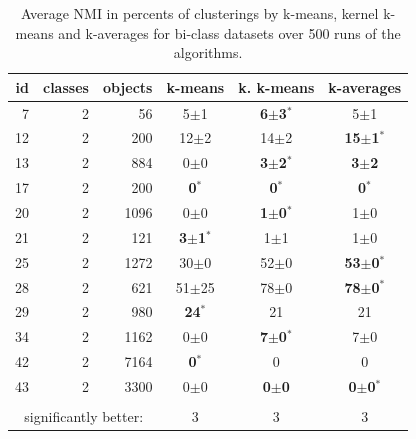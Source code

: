 \documentclass[10pt,journal,compsoc]{IEEEtran}
\begin{document}
\begin{table} 
\begin{center} 
\caption{Average NMI in percents of clusterings by k-means, kernel k-means and k-averages for bi-class datasets over 500 runs of the algorithms.}
\label{tab:results-2} 
\begin{tabular}{rrrccc} 
id & classes & objects & k-means & k. k-means & k-averages \\ 
\hline 
 7 & 2 &   56 & 5$\pm$1 & \textbf{6$\pm$3$^*$} & 5$\pm$1 \\ 
12 & 2 &  200 & 12$\pm$2 & 14$\pm$2 & \textbf{15$\pm$1$^*$} \\ 
13 & 2 &  884 & 0$\pm$0 & \textbf{3$\pm$2$^*$} & \textbf{3$\pm$2} \\ 
17 & 2 &  200 & \textbf{0$^*$} & \textbf{0$^*$} & \textbf{0$^*$} \\ 
20 & 2 & 1096 & 0$\pm$0 & \textbf{1$\pm$0$^*$} & 1$\pm$0 \\ 
21 & 2 &  121 & \textbf{3$\pm$1$^*$} & 1$\pm$1 & 1$\pm$0 \\ 
25 & 2 & 1272 & 30$\pm$0 & 52$\pm$0 & \textbf{53$\pm$0$^*$} \\ 
28 & 2 &  621 & 51$\pm$25 &  78$\pm$0 & \textbf{ 78$\pm$0$^*$} \\ 
29 & 2 &  980 & \textbf{24$^*$} & 21 & 21 \\ 
34 & 2 & 1162 & 0$\pm$0 & \textbf{7$\pm$0$^*$} & 7$\pm$0 \\ 
42 & 2 & 7164 & \textbf{0$^*$} & 0 & 0 \\ 
43 & 2 & 3300 & 0$\pm$0 & \textbf{0$\pm$0} & \textbf{0$\pm$0$^*$} \\ 
\hline 
\vspace{-.2cm} \\
\multicolumn{3}{c}{significantly better:}  & 3 & 3 & 3 \\ 
\end{tabular} 
\end{center} 
\end{table} 
 
 
\end{document}
